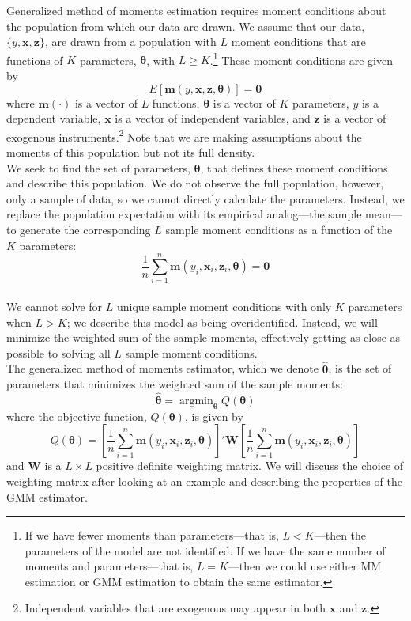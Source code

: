 \documentclass[11pt,letterpaper]{article}
\DeclareMathOperator*{\argmin}{argmin}
\begin{document}
\noindent Generalized method of moments estimation requires moment conditions about the population from which our data are drawn. We assume that our data, $\{y, \bm{x}, \bm{z}\}$, are drawn from a population with $L$ moment conditions that are functions of $K$ parameters, $\bm{\theta}$, with $L \geq K$.\footnote{If we have fewer moments than parameters---that is, $L < K$---then the parameters of the model are not identified. If we have the same number of moments and parameters---that is, $L = K$---then we could use either MM estimation or GMM estimation to obtain the same estimator.} These moment conditions are given by
$$E[\bm{m}(y, \bm{x}, \bm{z}, \bm{\theta})] = \bm{0}$$
where $\bm{m}(\cdot)$ is a vector of $L$ functions, $\bm{\theta}$ is a vector of $K$ parameters, $y$ is a dependent variable, $\bm{x}$ is a vector of independent variables, and $\bm{z}$ is a vector of exogenous instruments.\footnote{Independent variables that are exogenous may appear in both $\bm{x}$ and $\bm{z}$.} Note that we are making assumptions about the moments of this population but not its full density. \\

\noindent We seek to find the set of parameters, $\bm{\theta}$, that defines these moment conditions and describe this population. We do not observe the full population, however, only a sample of data, so we cannot directly calculate the parameters. Instead, we replace the population expectation with its empirical analog---the sample mean---to generate the corresponding $L$ sample moment conditions as a function of the $K$ parameters:
$$\frac{1}{n} \sum_{i = 1}^n \bm{m}(y_i, \bm{x}_i, \bm{z}_i, \bm{\theta}) = \bm{0}$$ \\
We cannot solve for $L$ unique sample moment conditions with only $K$ parameters when $L > K$; we describe this model as being overidentified. Instead, we will minimize the weighted sum of the sample moments, effectively getting as close as possible to solving all $L$ sample moment conditions. \\

\noindent The generalized method of moments estimator, which we denote $\widehat{\bm{\theta}}$, is the set of parameters that minimizes the weighted sum of the sample moments:
$$\widehat{\bm{\theta}} = \argmin_{\bm{\theta}} Q(\bm{\theta})$$
where the objective function, $Q(\bm{\theta})$, is given by
$$Q(\bm{\theta}) = \left[ \frac{1}{n} \sum_{i = 1}^n \bm{m}(y_i, \bm{x}_i, \bm{z}_i, \bm{\theta}) \right]' \bm{W} \left[ \frac{1}{n} \sum_{i = 1}^n \bm{m}(y_i, \bm{x}_i, \bm{z}_i, \bm{\theta}) \right]$$
and $\bm{W}$ is a $L \times L$ positive definite weighting matrix. We will discuss the choice of weighting matrix after looking at an example and describing the properties of the GMM estimator.
\end{document}
